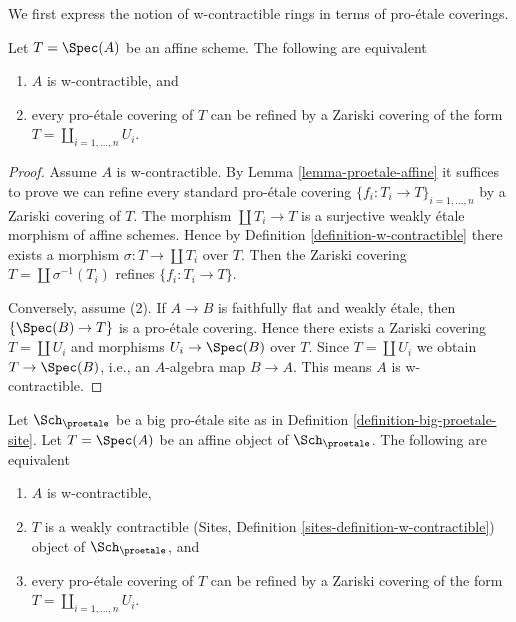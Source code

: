 \noindent
We first express the notion of w-contractible rings in terms of
pro-\'etale coverings.

\begin{lemma}
\label{lemma-w-contractible-proetale-cover}
Let $T = \Spec(A)$ be an affine scheme. The following are equivalent
\begin{enumerate}
\item $A$ is w-contractible, and
\item every pro-\'etale covering of $T$ can be refined by
a Zariski covering of the form $T = \coprod_{i = 1, \ldots, n} U_i$.
\end{enumerate}
\end{lemma}

\begin{proof}
Assume $A$ is w-contractible. By Lemma \ref{lemma-proetale-affine}
it suffices to prove we can refine every standard pro-\'etale covering
$\{f_i : T_i \to T\}_{i = 1, \ldots, n}$ by a Zariski covering of $T$.
The morphism $\coprod T_i \to T$ is a surjective weakly \'etale morphism
of affine schemes. Hence by Definition \ref{definition-w-contractible}
there exists a morphism $\sigma : T \to \coprod T_i$ over $T$.
Then the Zariski covering $T = \coprod \sigma^{-1}(T_i)$
refines $\{f_i : T_i \to T\}$.

\medskip\noindent
Conversely, assume (2). If $A \to B$ is faithfully flat and weakly \'etale,
then $\{\Spec(B) \to T\}$ is a pro-\'etale covering.
Hence there exists a Zariski covering $T = \coprod U_i$
and morphisms $U_i \to \Spec(B)$ over $T$. Since $T = \coprod U_i$
we obtain $T \to \Spec(B)$, i.e., an $A$-algebra map $B \to A$.
This means $A$ is w-contractible.
\end{proof}

\begin{lemma}
\label{lemma-w-contractible-is-weakly-contractible}
Let $\Sch_\proetale$ be a big pro-\'etale site as in
Definition \ref{definition-big-proetale-site}.
Let $T = \Spec(A)$ be an affine object of $\Sch_\proetale$.
The following are equivalent
\begin{enumerate}
\item $A$ is w-contractible,
\item $T$ is a weakly contractible
(Sites, Definition \ref{sites-definition-w-contractible})
object of $\Sch_\proetale$, and
\item every pro-\'etale covering of $T$ can be refined by
a Zariski covering of the form $T = \coprod_{i = 1, \ldots, n} U_i$.
\end{enumerate}
\end{lemma}


